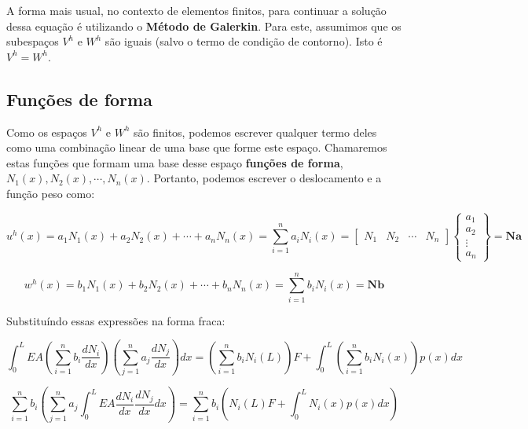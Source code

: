        A forma mais usual, no contexto de elementos finitos, para continuar a solução dessa equação é utilizando o \textbf{Método de Galerkin}. Para este, assumimos que os subespaços $V^h$ e $W^h$ são iguais (salvo o termo de condição de contorno). Isto é $V^h = W^h$.

    \subsection{Funções de forma}

        Como os espaços $V^h$ e $W^h$ são finitos, podemos escrever qualquer termo deles como uma combinação linear de uma base que forme este espaço. Chamaremos estas funções que formam uma base desse espaço \textbf{funções de forma}, $N_1(x), N_2(x), \cdots, N_n(x)$. Portanto, podemos escrever o deslocamento e a função peso como:

        \begin{equation}
            u^h(x) = a_1 N_1(x) + a_2 N_2(x) + \cdots + a_n N_n(x) = \sum_{i=1}^n a_i N_i(x) =
            \begin{bmatrix}
                N_1 & 
                N_2 &
                \cdots&
                N_n
            \end{bmatrix}
            \begin{Bmatrix}
                a_1 \\ 
                a_2 \\
                \vdots\\
                a_n
            \end{Bmatrix} 
            = \mathbf{N} \mathbf{a}
        \end{equation}

        \begin{equation}
            w^h(x) = b_1 N_1(x) + b_2 N_2(x) + \cdots + b_n N_n(x) = \sum_{i=1}^n b_i N_i(x) = \mathbf{N} \mathbf{b}
        \end{equation}

        Substituíndo essas expressões na forma fraca:

        \begin{equation*}
            \int_0^L EA \left(\sum_{i=1}^n b_i\frac{dN_i}{dx}\right) \left(\sum_{j=1}^n a_j\frac{dN_j}{dx}\right) dx = \left(\sum_{i=1}^n b_i N_i(L)\right)F + \int_0^L \left(\sum_{i=1}^n b_i N_i(x)\right) p(x) dx
        \end{equation*}

        \begin{equation*}
            \sum_{i=1}^n b_i \left( \sum_{j=1}^n a_j\int_0^L EA \frac{dN_i}{dx} \frac{dN_j}{dx} dx \right) = \sum_{i=1}^n b_i \left(N_i(L) F + \int_0^L N_i(x) p(x) dx\right)
        \end{equation*}

